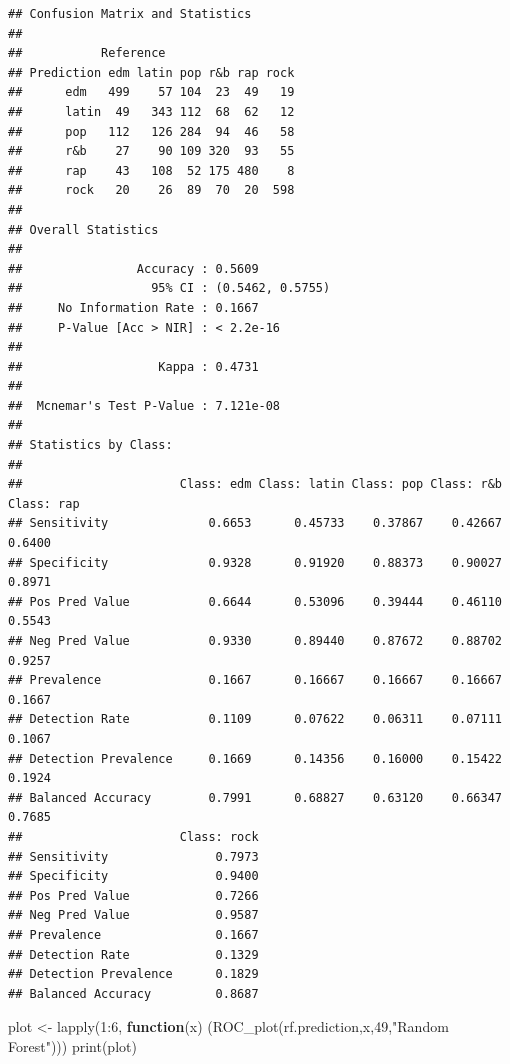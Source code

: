 \documentclass[
]{article}
\newenvironment{Shaded}{\begin{snugshade}}{\end{snugshade}}
\newcommand{\ControlFlowTok}[1]{\textcolor[rgb]{0.13,0.29,0.53}{\textbf{#1}}}
\newcommand{\DecValTok}[1]{\textcolor[rgb]{0.00,0.00,0.81}{#1}}
\newcommand{\FunctionTok}[1]{\textcolor[rgb]{0.00,0.00,0.00}{#1}}
\newcommand{\NormalTok}[1]{#1}
\newcommand{\OtherTok}[1]{\textcolor[rgb]{0.56,0.35,0.01}{#1}}
\newcommand{\SpecialCharTok}[1]{\textcolor[rgb]{0.00,0.00,0.00}{#1}}
\newcommand{\StringTok}[1]{\textcolor[rgb]{0.31,0.60,0.02}{#1}}
\begin{document}
\begin{verbatim}
## Confusion Matrix and Statistics
## 
##           Reference
## Prediction edm latin pop r&b rap rock
##      edm   499    57 104  23  49   19
##      latin  49   343 112  68  62   12
##      pop   112   126 284  94  46   58
##      r&b    27    90 109 320  93   55
##      rap    43   108  52 175 480    8
##      rock   20    26  89  70  20  598
## 
## Overall Statistics
##                                           
##                Accuracy : 0.5609          
##                  95% CI : (0.5462, 0.5755)
##     No Information Rate : 0.1667          
##     P-Value [Acc > NIR] : < 2.2e-16       
##                                           
##                   Kappa : 0.4731          
##                                           
##  Mcnemar's Test P-Value : 7.121e-08       
## 
## Statistics by Class:
## 
##                      Class: edm Class: latin Class: pop Class: r&b Class: rap
## Sensitivity              0.6653      0.45733    0.37867    0.42667     0.6400
## Specificity              0.9328      0.91920    0.88373    0.90027     0.8971
## Pos Pred Value           0.6644      0.53096    0.39444    0.46110     0.5543
## Neg Pred Value           0.9330      0.89440    0.87672    0.88702     0.9257
## Prevalence               0.1667      0.16667    0.16667    0.16667     0.1667
## Detection Rate           0.1109      0.07622    0.06311    0.07111     0.1067
## Detection Prevalence     0.1669      0.14356    0.16000    0.15422     0.1924
## Balanced Accuracy        0.7991      0.68827    0.63120    0.66347     0.7685
##                      Class: rock
## Sensitivity               0.7973
## Specificity               0.9400
## Pos Pred Value            0.7266
## Neg Pred Value            0.9587
## Prevalence                0.1667
## Detection Rate            0.1329
## Detection Prevalence      0.1829
## Balanced Accuracy         0.8687
\end{verbatim}

\begin{Shaded}
\begin{Highlighting}[]
\NormalTok{plot }\OtherTok{\textless{}{-}} \FunctionTok{lapply}\NormalTok{(}\DecValTok{1}\SpecialCharTok{:}\DecValTok{6}\NormalTok{, }\ControlFlowTok{function}\NormalTok{(x) (}\FunctionTok{ROC\_plot}\NormalTok{(rf.prediction,x,}\DecValTok{49}\NormalTok{,}\StringTok{"Random Forest"}\NormalTok{)))}
\FunctionTok{print}\NormalTok{(plot)}
\end{Highlighting}
\end{Shaded}
\end{document}
